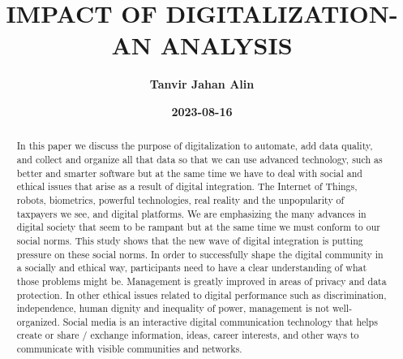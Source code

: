 \documentclass{article}
\title{\textbf{IMPACT OF DIGITALIZATION- AN ANALYSIS}}
\date{\textbf{2023-08-16}}
\author{\textbf{Tanvir Jahan Alin}}
\begin{document}
\maketitle
\tableofcontents
\pagebreak
\begin{abstract}
In this paper we discuss the purpose of digitalization to automate, add data quality, and collect and organize all that data
so that we can use advanced technology, such as better and smarter software but at the same time we have to deal with social and
ethical issues that arise as a result of digital integration. The Internet of Things, robots, biometrics, powerful technologies, real
reality and the unpopularity of taxpayers we see, and digital platforms. We are emphasizing the many advances in digital society
that seem to be rampant but at the same time we must conform to our social norms. This study shows that the new wave of digital
integration is putting pressure on these social norms. In order to successfully shape the digital community in a socially and ethical
way, participants need to have a clear understanding of what those problems might be. Management is greatly improved in areas of
privacy and data protection. In other ethical issues related to digital performance such as discrimination, independence, human
dignity and inequality of power, management is not well-organized. Social media is an interactive digital communication technology
that helps create or share / exchange information, ideas, career interests, and other ways to communicate with visible communities
and networks. 
\end{abstract}
\end{document}
